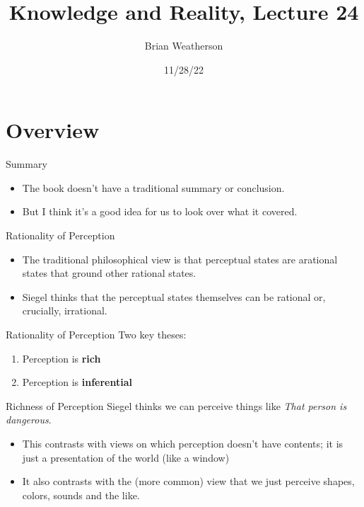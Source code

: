 \documentclass[
  17pt,
  letterpaper,
  ignorenonframetext,
  aspectratio=169,
  xcolor={dvipsnames}]{beamer}
\title{Knowledge and Reality, Lecture 24}
\author{Brian Weatherson}
\date{11/28/22}
\providecommand{\tightlist}{%
  \setlength{\itemsep}{0pt}\setlength{\parskip}{0pt}}\usepackage{longtable,booktabs,array}
\begin{document}
\frame{\titlepage}
\ifdefined\Shaded\renewenvironment{Shaded}{\begin{tcolorbox}[interior hidden, enhanced, borderline west={3pt}{0pt}{shadecolor}, breakable, frame hidden, boxrule=0pt, sharp corners]}{\end{tcolorbox}}\fi

\hypertarget{overview}{%
\section{Overview}\label{overview}}

\begin{frame}{Summary}
\protect\hypertarget{summary}{}
\begin{itemize}[<+->]
\tightlist
\item
  The book doesn't have a traditional summary or conclusion.
\item
  But I think it's a good idea for us to look over what it covered.
\end{itemize}
\end{frame}

\begin{frame}{Rationality of Perception}
\protect\hypertarget{rationality-of-perception}{}
\begin{itemize}[<+->]
\tightlist
\item
  The traditional philosophical view is that perceptual states are
  arational states that ground other rational states.
\item
  Siegel thinks that the perceptual states themselves can be rational
  or, crucially, irrational.
\end{itemize}
\end{frame}

\begin{frame}{Rationality of Perception}
\protect\hypertarget{rationality-of-perception-1}{}
Two key theses:

\begin{enumerate}[<+->]
\tightlist
\item
  Perception is \textbf{rich}
\item
  Perception is \textbf{inferential}
\end{enumerate}
\end{frame}

\begin{frame}{Richness of Perception}
\protect\hypertarget{richness-of-perception}{}
Siegel thinks we can perceive things like \emph{That person is
dangerous}.

\begin{itemize}[<+->]
\tightlist
\item
  This contrasts with views on which perception doesn't have contents;
  it is just a presentation of the world (like a window)
\item
  It also contrasts with the (more common) view that we just perceive
  shapes, colors, sounds and the like.
\end{itemize}
\end{frame}
\end{document}
